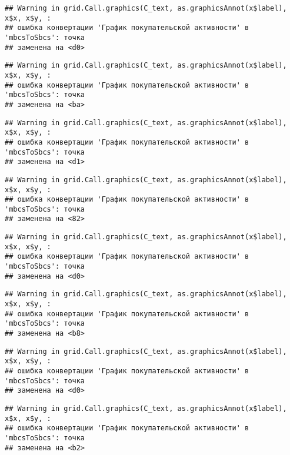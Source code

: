 \documentclass[
]{article}
\begin{document}
\begin{verbatim}
## Warning in grid.Call.graphics(C_text, as.graphicsAnnot(x$label), x$x, x$y, :
## ошибка конвертации 'График покупательской активности' в 'mbcsToSbcs': точка
## заменена на <d0>
\end{verbatim}

\begin{verbatim}
## Warning in grid.Call.graphics(C_text, as.graphicsAnnot(x$label), x$x, x$y, :
## ошибка конвертации 'График покупательской активности' в 'mbcsToSbcs': точка
## заменена на <ba>
\end{verbatim}

\begin{verbatim}
## Warning in grid.Call.graphics(C_text, as.graphicsAnnot(x$label), x$x, x$y, :
## ошибка конвертации 'График покупательской активности' в 'mbcsToSbcs': точка
## заменена на <d1>
\end{verbatim}

\begin{verbatim}
## Warning in grid.Call.graphics(C_text, as.graphicsAnnot(x$label), x$x, x$y, :
## ошибка конвертации 'График покупательской активности' в 'mbcsToSbcs': точка
## заменена на <82>
\end{verbatim}

\begin{verbatim}
## Warning in grid.Call.graphics(C_text, as.graphicsAnnot(x$label), x$x, x$y, :
## ошибка конвертации 'График покупательской активности' в 'mbcsToSbcs': точка
## заменена на <d0>
\end{verbatim}

\begin{verbatim}
## Warning in grid.Call.graphics(C_text, as.graphicsAnnot(x$label), x$x, x$y, :
## ошибка конвертации 'График покупательской активности' в 'mbcsToSbcs': точка
## заменена на <b8>
\end{verbatim}

\begin{verbatim}
## Warning in grid.Call.graphics(C_text, as.graphicsAnnot(x$label), x$x, x$y, :
## ошибка конвертации 'График покупательской активности' в 'mbcsToSbcs': точка
## заменена на <d0>
\end{verbatim}

\begin{verbatim}
## Warning in grid.Call.graphics(C_text, as.graphicsAnnot(x$label), x$x, x$y, :
## ошибка конвертации 'График покупательской активности' в 'mbcsToSbcs': точка
## заменена на <b2>
\end{verbatim}
\end{document}

